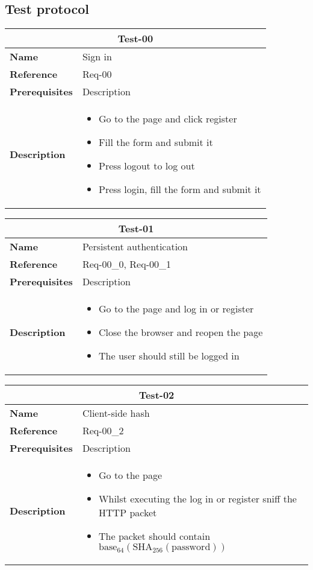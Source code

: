 \documentclass[../documentation.tex]{subfiles}
\begin{document}
\subsection{Test protocol}

\newcommand{\requirement}[5]{
    \bgroup{}
    \def\arraystretch{1.25}
    \begin{center}
        \begin{tabular}{ |l|p{9cm}| }
            \hline
            \multicolumn{2}{|c|}{\textbf{Test-#1}} \\
            \hline
            \textbf{Name} & #2 \\
            \hline
            \textbf{Reference} & #3 \\
            \hline
            \textbf{Prerequisites} & #4 \\
            \hline
            \textbf{Description} &
            \begin{itemize}
                #5
            \end{itemize} \\
            \hline
        \end{tabular}
    \end{center}
    \egroup{}
}

\requirement{00}
    {Sign in}
    {Req-00}
    {Description}
    {
        \item Go to the page and click register
        \item Fill the form and submit it
        \item Press logout to log out
        \item Press login, fill the form and submit it
    }

\requirement{01}
    {Persistent authentication}
    {Req-00\_0, Req-00\_1}
    {Description}
    {
        \item Go to the page and log in or register
        \item Close the browser and reopen the page
        \item The user should still be logged in
    }

\requirement{02}
    {Client-side hash}
    {Req-00\_2}
    {Description}
    {
        \item Go to the page
        \item Whilst executing the log in or register sniff the HTTP packet
        \item The packet should contain \(\text{base}_{64}(\text{SHA}_{256}(\text{password}))\)
    }
\end{document}
